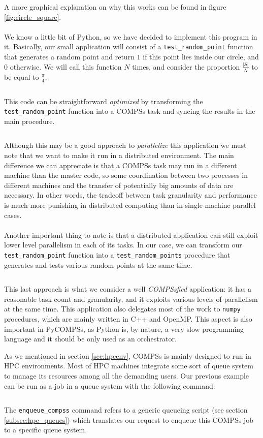 A more graphical explanation on why this works can be found in figure \ref{fig:circle_square}.\\
\\
We know a little bit of Python, so we have decided to implement this program in it. Basically, our small application will consist of a \verb|test_random_point| function that generates a random point and return $1$ if this point lies inside our circle, and $0$ otherwise. We will call this function $N$ times, and consider the proportion $\frac{|S|}{N}$ to be equal to $\frac{\pi}{4}$.
\inputminted{python}{applications/PI_SQUARE/sequential.py}
This code can be straightforward \textit{optimized} by transforming the \verb|test_random_point| function into a COMPSs task and syncing the results in the main procedure.
\inputminted{python}{applications/PI_SQUARE/pycompss_naive.py}
Although this may be a good approach to \textit{parallelize} this application we must note that we want to make it run in a distributed environment. The main difference we can appreciate is that a COMPSs task may run in a different machine than the master code, so some coordination between two processes in different machines and the transfer of potentially big amounts of data are necessary. In other words, the tradeoff between task granularity and performance is much more punishing in distributed computing than in single-machine parallel cases.\\
\\
Another important thing to note is that a distributed application can still exploit lower level parallelism in each of its tasks. In our case, we can transform our \verb|test_random_point| function into a \verb|test_random_points| procedure that generates and tests various random points at the same time.

\inputminted{python}{applications/PI_SQUARE/pycompss_vectorized.py}

This last approach is what we consider a well \textit{COMPSsfied} application: it has a reasonable task count and granularity, and it exploits various levels of parallelism at the same time. This application also delegates most of the work to \verb|numpy| procedures, which are mainly written in C++ and OpenMP. This aspect is also important in PyCOMPSs, as Python is, by nature, a very slow programming language and it should be only used as an orchestrator.

As we mentioned in section \ref{sec:hpcenv}, COMPSs is mainly designed to run in HPC environments. Most of HPC machines integrate some sort of queue system to manage its resources among all the demanding users. Our previous example can be run as a job in a queue system with the following command:

\inputminted{bash}{applications/PI_SQUARE/run_mn4.sh}

The \verb|enqueue_compss| command refers to a generic queueing script (see section \ref{subsec:hpc_queues}) which translates our request to enqueue this COMPSs job to a specific queue system.
